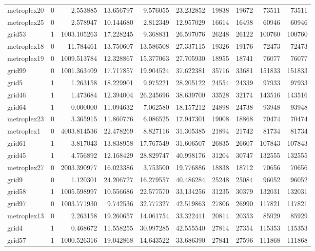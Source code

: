 \begin{longtable}{|l|r|r|r|r|r|r|r|r|r|}
metroplex20 & 0 & 2.553885 & 13.656797 & 9.576055 & 23.232852 & 19838 & 19672 & 73511 & 73511 \\
metroplex25 & 0 & 2.578947 & 10.144680 & 2.812349 & 12.957029 & 16614 & 16498 & 60946 & 60946 \\
grid53 & 1 & 1003.105263 & 17.228245 & 9.368831 & 26.597076 & 26248 & 26122 & 100760 & 100760 \\
metroplex18 & 0 & 11.784461 & 13.750607 & 13.586508 & 27.337115 & 19326 & 19176 & 72473 & 72473 \\
metroplex19 & 0 & 1009.513784 & 12.328867 & 15.377063 & 27.705930 & 18955 & 18741 & 76077 & 76077 \\
grid99 & 0 & 1001.363409 & 17.717857 & 19.904524 & 37.622381 & 35716 & 33681 & 151833 & 151833 \\
grid5 & 1 & 1.263158 & 18.229901 & 9.975221 & 28.205122 & 24554 & 24339 & 97933 & 97933 \\
grid46 & 1 & 1.473684 & 12.394004 & 26.245696 & 38.639700 & 33528 & 32174 & 143516 & 143516 \\
grid64 & 1 & 0.000000 & 11.094632 & 7.062580 & 18.157212 & 24898 & 24738 & 93948 & 93948 \\
metroplex23 & 0 & 3.365915 & 11.860776 & 6.086525 & 17.947301 & 19008 & 18868 & 70474 & 70474 \\
metroplex1 & 0 & 4003.814536 & 22.478269 & 8.827116 & 31.305385 & 21894 & 21742 & 81734 & 81734 \\
grid61 & 1 & 3.817043 & 13.838958 & 17.767549 & 31.606507 & 26835 & 26607 & 107843 & 107843 \\
grid45 & 1 & 4.756892 & 12.168429 & 28.829747 & 40.998176 & 31204 & 30747 & 132555 & 132555 \\
metroplex27 & 0 & 2003.390977 & 16.023386 & 3.753500 & 19.776886 & 18838 & 18712 & 70656 & 70656 \\
grid9 & 0 & 1.120301 & 24.206727 & 16.279557 & 40.486284 & 25248 & 25084 & 96052 & 96052 \\
grid58 & 1 & 1005.598997 & 10.556686 & 22.577570 & 33.134256 & 31235 & 30379 & 132031 & 132031 \\
grid97 & 0 & 1003.771930 & 9.742536 & 32.777327 & 42.519863 & 27806 & 26990 & 117821 & 117821 \\
metroplex13 & 0 & 2.263158 & 19.260657 & 14.061754 & 33.322411 & 20814 & 20353 & 85929 & 85929 \\
grid4 & 1 & 0.468672 & 11.558255 & 30.997285 & 42.555540 & 27814 & 27354 & 115353 & 115353 \\
grid57 & 1 & 1000.526316 & 19.042868 & 14.643522 & 33.686390 & 27841 & 27596 & 111868 & 111868 \\

\end{longtable}
